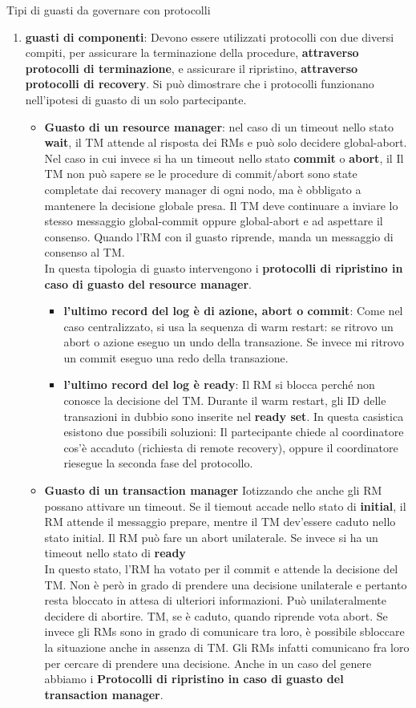 Tipi di guasti da governare con protocolli 
\begin{enumerate}
    \item \textbf{guasti di componenti}: Devono essere utilizzati protocolli con due diversi compiti, per assicurare la terminazione della procedure, \textbf{attraverso protocolli di terminazione}, e assicurare il ripristino, \textbf{attraverso protocolli di recovery}. Si può dimostrare che i protocolli funzionano nell’ipotesi di guasto di un solo partecipante.
    \begin{itemize}
        \item \textbf{Guasto di un resource manager}: nel caso di un timeout nello stato \textbf{wait}, il TM attende al risposta dei RMs e può solo decidere global-abort. Nel caso in cui invece si ha un timeout nello stato \textbf{commit} o \textbf{abort}, il Il TM non può sapere se le procedure di commit/abort sono state completate dai recovery manager di ogni nodo, ma è obbligato a mantenere la decisione globale presa. Il TM deve continuare a inviare lo stesso messaggio global-commit oppure global-abort e ad aspettare il consenso. Quando l’RM con il guasto riprende, manda un messaggio di consenso al TM. \\
        In questa tipologia di guasto intervengono i \textbf{protocolli di ripristino in caso di guasto del resource manager}. 
        \begin{itemize}
            \item \textbf{l’ultimo record del log è di azione, abort o commit}: Come nel caso centralizzato, si usa la sequenza di warm restart: se ritrovo un abort o azione eseguo un undo della transazione. Se invece mi ritrovo un commit eseguo una redo della transazione.
            \item \textbf{l’ultimo record del log è ready}: Il RM si blocca perché non conosce la decisione del TM. Durante il warm restart, gli ID delle transazioni in dubbio sono inserite nel \textbf{ready set}. In questa casistica esistono due possibili soluzioni: Il partecipante chiede al coordinatore cos’è accaduto (richiesta di remote recovery), oppure il coordinatore riesegue la seconda fase del protocollo.
        \end{itemize}
        \item \textbf{Guasto di un transaction manager} Iotizzando che anche gli RM possano attivare un timeout. Se il tiemout accade nello stato di \textbf{initial}, il RM attende il messaggio prepare, mentre il TM dev’essere caduto nello stato initial. Il RM può fare un abort unilaterale. Se invece si ha un timeout nello stato di \textbf{ready} \\ In questo stato, l’RM ha votato per il commit e attende la decisione del TM. Non è però in grado di prendere una decisione unilaterale e pertanto resta bloccato in attesa di ulteriori informazioni. Può unilateralmente decidere di abortire. TM, se è caduto, quando riprende vota abort. Se invece gli RMs sono in grado di comunicare tra loro, è possibile sbloccare la situazione anche in assenza di TM. Gli RMs infatti comunicano fra loro per cercare di prendere una decisione. Anche in un caso del genere abbiamo i \textbf{Protocolli di ripristino in caso di guasto del transaction manager}. 

\end{itemize}
\end{enumerate}
